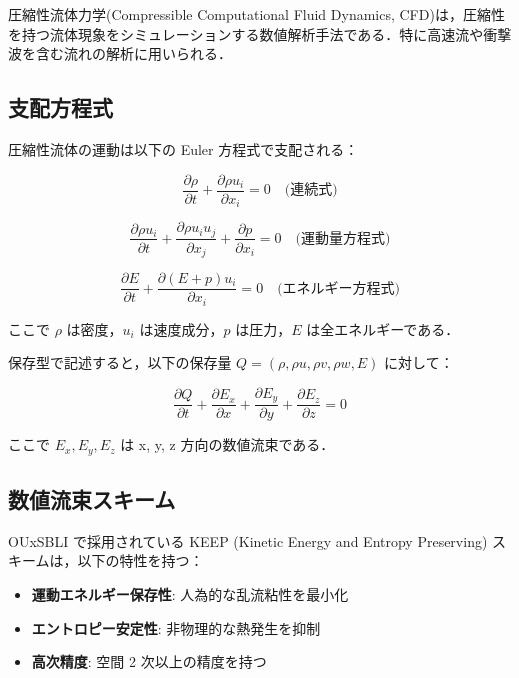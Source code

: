 圧縮性流体力学(Compressible Computational Fluid Dynamics, CFD)は，圧縮性を持つ流体現象をシミュレーションする数値解析手法である．特に高速流や衝撃波を含む流れの解析に用いられる．

\subsection{支配方程式}

圧縮性流体の運動は以下の Euler 方程式で支配される：

\begin{equation}
\frac{\partial \rho}{\partial t} + \frac{\partial \rho u_i}{\partial x_i} = 0 \quad \text{(連続式)}
\end{equation}

\begin{equation}
\frac{\partial \rho u_i}{\partial t} + \frac{\partial \rho u_i u_j}{\partial x_j} + \frac{\partial p}{\partial x_i} = 0 \quad \text{(運動量方程式)}
\end{equation}

\begin{equation}
\frac{\partial E}{\partial t} + \frac{\partial (E + p)u_i}{\partial x_i} = 0 \quad \text{(エネルギー方程式)}
\end{equation}

ここで $\rho$ は密度，$u_i$ は速度成分，$p$ は圧力，$E$ は全エネルギーである．

保存型で記述すると，以下の保存量 $Q = (\rho, \rho u, \rho v, \rho w, E)$ に対して：

\begin{equation}
\frac{\partial Q}{\partial t} + \frac{\partial E_x}{\partial x} + \frac{\partial E_y}{\partial y} + \frac{\partial E_z}{\partial z} = 0
\end{equation}

ここで $E_x, E_y, E_z$ は x, y, z 方向の数値流束である．

\subsection{数値流束スキーム}

OUxSBLI で採用されている KEEP (Kinetic Energy and Entropy Preserving) スキームは，以下の特性を持つ：

\begin{itemize}
  \item \textbf{運動エネルギー保存性}: 人為的な乱流粘性を最小化
  \item \textbf{エントロピー安定性}: 非物理的な熱発生を抑制
  \item \textbf{高次精度}: 空間 2 次以上の精度を持つ
\end{itemize}

